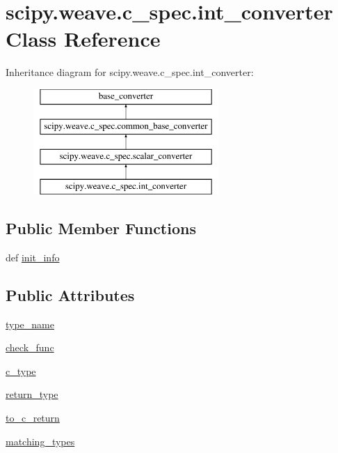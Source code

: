 \hypertarget{classscipy_1_1weave_1_1c__spec_1_1int__converter}{}\section{scipy.\+weave.\+c\+\_\+spec.\+int\+\_\+converter Class Reference}
\label{classscipy_1_1weave_1_1c__spec_1_1int__converter}
Inheritance diagram for scipy.\+weave.\+c\+\_\+spec.\+int\+\_\+converter\+:\begin{figure}[H]
\begin{center}
\leavevmode
\includegraphics[height=4.000000cm]{classscipy_1_1weave_1_1c__spec_1_1int__converter}
\end{center}
\end{figure}
\subsection*{Public Member Functions}
\begin{DoxyCompactItemize}
\item 
def \hyperlink{classscipy_1_1weave_1_1c__spec_1_1int__converter_a56000dd60936b83b6637c7f55ac670da}{init\+\_\+info}
\end{DoxyCompactItemize}
\subsection*{Public Attributes}
\begin{DoxyCompactItemize}
\item 
\hyperlink{classscipy_1_1weave_1_1c__spec_1_1int__converter_a947b7b9cb2cf2e7b79afbd5de421b37a}{type\+\_\+name}
\item 
\hyperlink{classscipy_1_1weave_1_1c__spec_1_1int__converter_ac892bc5b9754b2694b1f9580a22997d6}{check\+\_\+func}
\item 
\hyperlink{classscipy_1_1weave_1_1c__spec_1_1int__converter_a1f3efd256e1818b4f54b292c4182ef6c}{c\+\_\+type}
\item 
\hyperlink{classscipy_1_1weave_1_1c__spec_1_1int__converter_a66f1949cc412b4cc3df6e7bf72c8117f}{return\+\_\+type}
\item 
\hyperlink{classscipy_1_1weave_1_1c__spec_1_1int__converter_acac162800c5de81049a29c9ad21b5509}{to\+\_\+c\+\_\+return}
\item 
\hyperlink{classscipy_1_1weave_1_1c__spec_1_1int__converter_a11a608015e18ebc6f8fdc05bb41dee3e}{matching\+\_\+types}
\end{DoxyCompactItemize}


